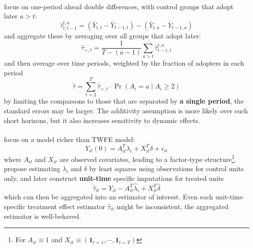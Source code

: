 \documentclass[twoside]{article}
\begin{document}
\paragraph*{\citet{de2020two}} focus on one-period ahead double differences, with control groups that adopt later $a>t$: $$ \hat{\tau}^{t,a}_{t,t-1} = \left(\bar{Y}_{t,t}-\bar{Y}_{t-1,t}\right) - \left(\bar{Y}_{t,a}-\bar{Y}_{t-1,a}\right) $$
and aggregate these by averaging over all groups that adopt later: $$\hat{\tau}_{+,t} = \frac{1}{T-(a-1)} \sum_{a>t} \hat{\tau}^{t,a}_{t-1,t} $$
and then average over time periods, weighted by the fraction of adopters in each period $$ \hat{\tau} = \sum^T_{t=2} \hat{\tau}_{+,t} \cdot \Pr \left(A_i=a\mid A_i\geq 2\right) $$
by limiting the comparsons to those that are separated by \textbf{a single period}, the standard errors may be larger. The additivity assumption is more likely over such short horizons, but it also increases sensitivity to dynamic effects.

\paragraph*{\citet{borusyak2024revisiting}} focus on a model richer than TWFE model: $$ Y_{it}(0) = A^T_{it}\lambda_i + X_{it}^T\delta +\epsilon_{it} $$
where $A_{it}$ and $X_{it}$ are observed covariates, leading to a factor-type structure\footnote{For $A_{it}\equiv 1$ and $X_{it}\equiv \left(\mathbf{1}_{t=1},\cdots,\mathbf{1}_{t=T}\right)$}. 
\citet{borusyak2024revisiting} propose estimating $\lambda_i$ and $\delta$ by least squares using observations for control units only, and later construct \textbf{unit-time} specific imputations for treated units $$ \hat{\tau}_{it} = Y_{it} - A^T_{it}\hat{\lambda}_{i} + X^{T}_{it}\hat{\delta} $$
which can then be aggregated into an estimator of interest. Even each unit-time specific treatment effect estimator $\hat{\tau}_{it}$ might be inconsistent, the aggregated estimator is well-behaved.
\end{document}
